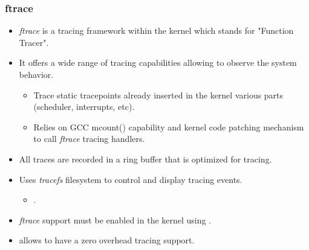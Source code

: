 \begin{frame}
  \frametitle{ftrace}
  \begin{itemize}
    \item {\em ftrace} is a tracing framework within the kernel which stands for
          "Function Tracer".
    \item It offers a wide range of tracing capabilities allowing to observe the
          system behavior.
    \begin{itemize}
      \item Trace static tracepoints already inserted in the kernel various
            parts (scheduler, interrupts, etc).
      \item Relies on GCC mcount() capability and kernel code patching mechanism
            to call {\em ftrace} tracing handlers.
    \end{itemize}
    \item All traces are recorded in a ring buffer that is optimized for tracing.
    \item Uses {\em tracefs} filesystem to control and display tracing events.
    \begin{itemize}
      \item {}.
    \end{itemize}
    \item {\em ftrace} support must be enabled in the kernel using
          .
    \item {} allows to have a zero overhead tracing
          support.
  \end{itemize}
\end{frame}

